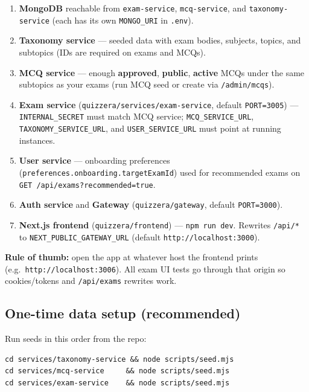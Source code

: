 \documentclass[11pt,a4paper]{article}
\begin{document}
\begin{enumerate}[leftmargin=*]
  \item \textbf{MongoDB} reachable from \texttt{exam-service}, \texttt{mcq-service}, and \texttt{taxonomy-service} (each has its own \texttt{MONGO\_URI} in \texttt{.env}).
  \item \textbf{Taxonomy service} --- seeded data with exam bodies, subjects, topics, and subtopics (IDs are required on exams and MCQs).
  \item \textbf{MCQ service} --- enough \textbf{approved}, \textbf{public}, \textbf{active} MCQs under the same subtopics as your exams (run MCQ seed or create via \texttt{/admin/mcqs}).
  \item \textbf{Exam service} (\texttt{quizzera/services/exam-service}, default \texttt{PORT=3005}) --- \texttt{INTERNAL\_SECRET} must match MCQ service; \texttt{MCQ\_SERVICE\_URL}, \texttt{TAXONOMY\_SERVICE\_URL}, and \texttt{USER\_SERVICE\_URL} must point at running instances.
  \item \textbf{User service} --- onboarding preferences (\texttt{preferences.onboarding.targetExamId}) used for recommended exams on \texttt{GET /api/exams?recommended=true}.
  \item \textbf{Auth service} and \textbf{Gateway} (\texttt{quizzera/gateway}, default \texttt{PORT=3000}).
  \item \textbf{Next.js frontend} (\texttt{quizzera/frontend}) --- \texttt{npm run dev}. Rewrites \texttt{/api/*} to \texttt{NEXT\_PUBLIC\_GATEWAY\_URL} (default \texttt{http://localhost:3000}).
\end{enumerate}

\textbf{Rule of thumb:} open the app at whatever host the frontend prints (e.g.\ \texttt{http://localhost:3006}). All exam UI tests go through that origin so cookies/tokens and \texttt{/api/exams} rewrites work.

\subsection{One-time data setup (recommended)}

Run seeds in this order from the repo:

\begin{lstlisting}
cd services/taxonomy-service && node scripts/seed.mjs
cd services/mcq-service     && node scripts/seed.mjs
cd services/exam-service    && node scripts/seed.mjs
\end{lstlisting}
\end{document}
